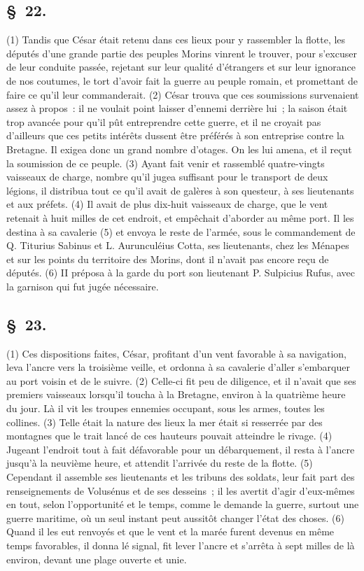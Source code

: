 \documentclass[french,twoside]{book} %
\begin{document}
\subsection[{§ 22.}]{ \textsc{§ 22.} }
\noindent (1) Tandis que César était retenu dans ces lieux pour y rassembler la flotte, les députés d’une grande partie des peuples Morins vinrent le trouver, pour s’excuser de leur conduite passée, rejetant sur leur qualité d’étrangers et sur leur ignorance de nos coutumes, le tort d’avoir fait la guerre au peuple romain, et promettant de faire ce qu’il leur commanderait. (2) César trouva que ces soumissions survenaient assez à propos : il ne voulait point laisser d’ennemi derrière lui ; la saison était trop avancée pour qu’il pût entreprendre cette guerre, et il ne croyait pas d’ailleurs que ces petits intérêts dussent être préférés à son entreprise contre la Bretagne. Il exigea donc un grand nombre d’otages. On les lui amena, et il reçut la soumission de ce peuple. (3) Ayant fait venir et rassemblé quatre-vingts vaisseaux de charge, nombre qu’il jugea suffisant pour le transport de deux légions, il distribua tout ce qu’il avait de galères à son questeur, à ses lieutenants et aux préfets. (4) Il avait de plus dix-huit vaisseaux de charge, que le vent retenait à huit milles de cet endroit, et empêchait d’aborder au même port. Il les destina à sa cavalerie (5) et envoya le reste de l’armée, sous le commandement de Q. Titurius Sabinus et L. Aurunculéius Cotta, ses lieutenants, chez les Ménapes et sur les points du territoire des Morins, dont il n’avait pas encore reçu de députés. (6) II préposa à la garde du port son lieutenant P. Sulpicius Rufus, avec la garnison qui fut jugée nécessaire.
\subsection[{§ 23.}]{ \textsc{§ 23.} }
\noindent (1) Ces dispositions faites, César, profitant d’un vent favorable à sa navigation, leva l’ancre vers la troisième veille, et ordonna à sa cavalerie d’aller s’embarquer au port voisin et de le suivre. (2) Celle-ci fit peu de diligence, et il n’avait que ses premiers vaisseaux lorsqu’il toucha à la Bretagne, environ à la quatrième heure du jour. Là il vit les troupes ennemies occupant, sous les armes, toutes les collines. (3) Telle était la nature des lieux la mer était si resserrée par des montagnes que le trait lancé de ces hauteurs pouvait atteindre le rivage. (4) Jugeant l’endroit tout à fait défavorable pour un débarquement, il resta à l’ancre jusqu’à la neuvième heure, et attendit l’arrivée du reste de la flotte. (5) Cependant il assemble ses lieutenants et les tribuns des soldats, leur fait part des renseignements de Volusénus et de ses desseins ; il les avertit d’agir d’eux-mêmes en tout, selon l’opportunité et le temps, comme le demande la guerre, surtout une guerre maritime, où un seul instant peut aussitôt changer l’état des choses. (6) Quand il les eut renvoyés et que le vent et la marée furent devenus en même temps favorables, il donna lé signal, fit lever l’ancre et s’arrêta à sept milles de là environ, devant une plage ouverte et unie.
\end{document}

